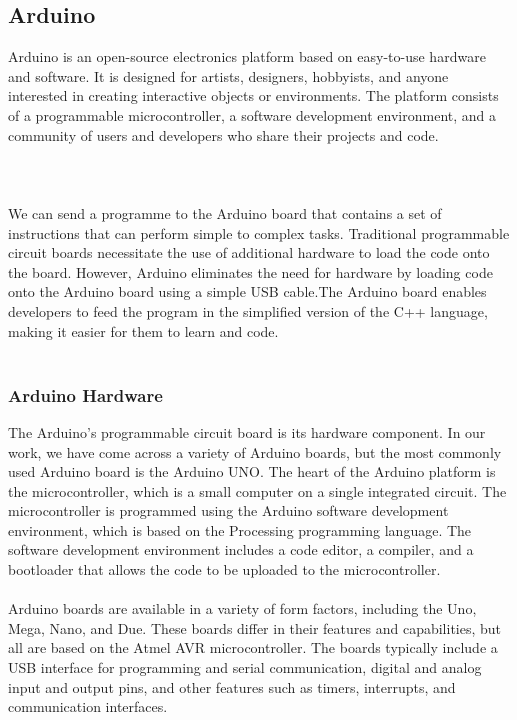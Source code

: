 \documentclass[12pt]{article}
\begin{document}
\subsection{Arduino}
Arduino is an open-source electronics platform based on easy-to-use hardware and software. It is designed for artists, designers, hobbyists, and anyone interested in creating interactive objects or environments. The platform consists of a programmable microcontroller, a software development environment, and a community of users and developers who share their projects and code.
\\
\\
\\
\\
We can send a programme to the Arduino board that contains a set of instructions that can perform simple to complex tasks. Traditional programmable circuit boards necessitate the use of additional hardware to load the code onto the board. However, Arduino eliminates the need for hardware by loading code onto the Arduino board using a simple USB cable.The Arduino board enables developers to feed the program in the simplified version of the C++ language, making it easier for them to learn and code. 
\\
\\
\subsubsection{Arduino Hardware}
The Arduino's programmable circuit board is its hardware component. In our work, we have come across a variety of Arduino boards, but the most commonly used Arduino board is the Arduino UNO. The heart of the Arduino platform is the microcontroller, which is a small computer on a single integrated circuit. The microcontroller is programmed using the Arduino software development environment, which is based on the Processing programming language. The software development environment includes a code editor, a compiler, and a bootloader that allows the code to be uploaded to the microcontroller.
\\
\\
Arduino boards are available in a variety of form factors, including the Uno, Mega, Nano, and Due. These boards differ in their features and capabilities, but all are based on the Atmel AVR microcontroller. The boards typically include a USB interface for programming and serial communication, digital and analog input and output pins, and other features such as timers, interrupts, and communication interfaces.
\\
 \\
\end{document}

